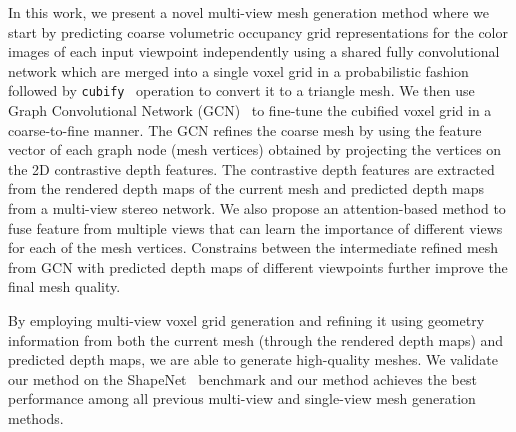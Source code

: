 In this work, we present a novel multi-view mesh generation method where we start by predicting coarse volumetric occupancy grid representations for the color images of each input viewpoint independently using a shared fully convolutional network which are merged into a single voxel grid in a probabilistic fashion followed by \texttt{cubify}~\cite{gkioxari2019meshrcnn} operation to convert it to a triangle mesh. We then use Graph Convolutional Network (GCN)~\cite{scarselli2008graph,wang2018pixel2mesh} to fine-tune the cubified voxel grid in a coarse-to-fine manner. The GCN refines the coarse mesh by using the feature vector of each graph node (mesh vertices) obtained by projecting the vertices on the 2D contrastive depth features. The contrastive depth features are extracted from the rendered depth maps of the current mesh and predicted depth maps from a multi-view stereo network. We also propose an attention-based method to fuse feature from multiple views that can learn the importance of different views for each of the mesh vertices. Constrains between the intermediate refined mesh from GCN with predicted depth maps of different viewpoints further improve the final mesh quality.

By employing multi-view voxel grid generation and refining it using geometry information from both the current mesh (through the rendered depth maps) and predicted depth maps, we are able to generate high-quality meshes.
We validate our method on the ShapeNet~\cite{chang2015shapenet} benchmark and our method achieves the best performance among all previous multi-view and single-view mesh generation methods.


